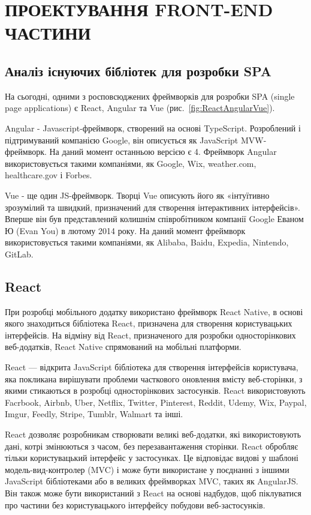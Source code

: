 \section{ПРОЕКТУВАННЯ FRONT-END ЧАСТИНИ}

\subsection{Аналіз існуючих бібліотек для розробки SPA}

На сьогодні, одними з росповсюджених фреймворків для розробки SPA (single page applications) є React, Angular та Vue (рис.~\ref{fig:ReactAngularVue}).


Angular - Javascript-фреймворк, створений на основі TypeScript. Розроблений і підтримуваний компанією Google, він описується як JavaScript MVW-фреймворк. На даний момент останньою версією є 4. Фреймворк Angular використовується такими компаніями, як Google, Wix, weather.com, healthcare.gov і Forbes.

Vue - ще один JS-фреймворк. Творці Vue описують його як «інтуїтивно зрозумілий та швидкий, призначений для створення інтерактивних інтерфейсів». Вперше він був представлений колишнім співробітником компанії Google Еваном Ю (Evan You) в лютому 2014 року. На даний момент фреймворк використовується такими компаніями, як Alibaba, Baidu, Expedia, Nintendo, GitLab.

\subsection{React}

При розробці мобільного додатку використано фреймворк React Native, в основі якого знаходиться бібліотека React, призначена для створення користувацьких інтерфейсів. На відміну від React, призначеного для розробки односторінкових веб-додатків, React Native спрямований на мобільні платформи.

React — відкрита JavaScript бібліотека для створення інтерфейсів користувача, яка покликана вирішувати проблеми часткового оновлення вмісту веб-сторінки, з якими стикаються в розробці односторінкових застосунків. React використовують Facrbook, Airbnb, Uber, Netflix, Twitter, Pinterest, Reddit, Udemy, Wix, Paypal, Imgur, Feedly, Stripe, Tumblr, Walmart та інші.

React дозволяє розробникам створювати великі веб-додатки, які використовують дані, котрі змінюються з часом, без перезавантаження сторінки. React обробляє тільки користувацький інтерфейс у застосунках. Це відповідає видові у шаблоні модель-вид-контролер (MVC) і може бути використане у поєднанні з іншими JavaScript бібліотеками або в великих фреймворках MVC, таких як AngularJS. Він також може бути використаний з React на основі надбудов, щоб піклуватися про частини без користувацького інтерфейсу побудови веб-застосунків.

